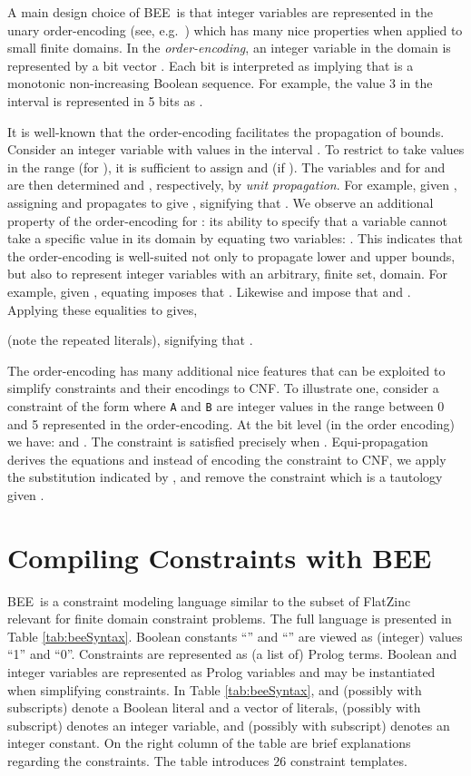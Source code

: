 \documentclass[runningheads,a4paper]{llncs}
\newcommand{\bee}{\textsf{BEE}}
\begin{document}
A main design choice of \bee\ is that integer variables are
represented in the unary order-encoding (see,
e.g.~\cite{baker,BailleuxB03}) which has many nice properties when
applied to small finite domains.
In the \emph{order-encoding}, an integer variable  in the domain
 is represented by a bit vector .
Each bit  is interpreted as  implying that 
is a monotonic non-increasing Boolean sequence.
For example, the value 3 in the interval  is represented in
5 bits as .


It is well-known that the order-encoding facilitates the propagation
of bounds. Consider an integer variable  with
values in the interval .  To restrict  \pagebreak to take values in the
range  (for ), it is sufficient to assign
 and  (if ). The variables  and
 for  and  are then determined 
and , respectively, by \emph{unit propagation}.  For example, 
given , assigning  and  propagates
to give , signifying that
.
We observe an additional property of the order-encoding for
: its ability to specify that a variable cannot
take a specific value  in its domain by equating two
variables: .
This indicates that the order-encoding is well-suited not only to
propagate lower and upper bounds, but also to represent integer
variables with an arbitrary, finite set, domain.
For example, given , equating  imposes
that . Likewise  and  impose that 
and . Applying these equalities to  gives,

(note the repeated literals),
signifying that .


The order-encoding has many additional nice features that can be
exploited to simplify constraints and their encodings to CNF. To
illustrate one, consider a constraint of the form 
where \texttt{A} and \texttt{B} are integer values in the range
between 0 and 5 represented in the order-encoding. At the bit level
(in the order encoding) we have:  and
.  The constraint is satisfied precisely
when . Equi-propagation derives
the equations  and instead of
encoding the constraint to CNF, we apply the substitution indicated by
, and remove the constraint which is a tautology given .


\section{Compiling Constraints with \bee}

\bee\ is a constraint modeling language similar to the subset of
FlatZinc~\cite{miniZinc2007} relevant for finite domain constraint
problems. The full language is presented in Table \ref{tab:beeSyntax}.
Boolean constants ``'' and ``'' are viewed as (integer)
values ``1'' and ``0''.  Constraints are represented as (a list of)
Prolog terms. Boolean and integer variables are represented as Prolog
variables and may be instantiated when simplifying constraints.
In Table \ref{tab:beeSyntax},  and  (possibly
with subscripts) denote a Boolean literal and a vector of literals,
 (possibly with subscript) denotes an integer variable,
and  (possibly with subscript) denotes an integer
constant.  On the right column of the table are brief explanations
regarding the constraints. The table introduces 26 constraint
templates.
\end{document}
